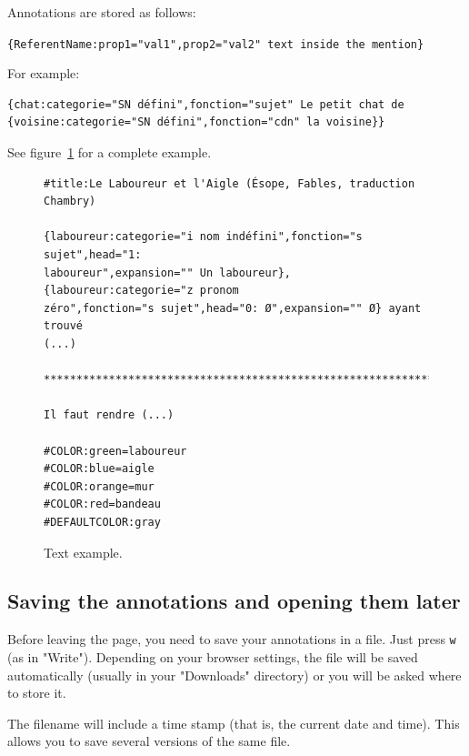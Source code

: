 \documentclass[12pt]{article}
\begin{document}
Annotations are stored as follows:

\verb+{ReferentName:prop1="val1",prop2="val2" text inside the mention}+

For example:

\begin{mdframed}
\begin{verbatim}
{chat:categorie="SN défini",fonction="sujet" Le petit chat de
{voisine:categorie="SN défini",fonction="cdn" la voisine}}
\end{verbatim}
\end{mdframed}

See figure~\ref{fig-sacr-example-text} for a complete example.

\begin{figure}[tbp]
\begin{mdframed}
\begin{verbatim}
#title:Le Laboureur et l'Aigle (Ésope, Fables, traduction Chambry)

{laboureur:categorie="i nom indéfini",fonction="s sujet",head="1:
laboureur",expansion="" Un laboureur}, {laboureur:categorie="z pronom
zéro",fonction="s sujet",head="0: Ø",expansion="" Ø} ayant trouvé
(...)

************************************************************************

Il faut rendre (...)

#COLOR:green=laboureur
#COLOR:blue=aigle
#COLOR:orange=mur
#COLOR:red=bandeau
#DEFAULTCOLOR:gray
\end{verbatim}
\end{mdframed}
\caption{Text example.}\label{fig-sacr-example-text}
\end{figure}


 \subsection{Saving the annotations and opening them later}

Before leaving the page, you need to save your annotations in a file.  Just
press \verb|w| (as in "Write").  Depending on your browser settings, the file
will be saved automatically (usually in your "Downloads" directory) or you
will be asked where to store it.

The filename will include a time stamp (that is, the current date and time).
This allows you to save several versions of the same file.
\end{document}
